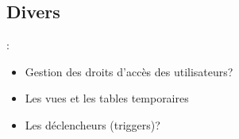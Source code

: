 \documentclass[10pt]{beamer}
\begin{document}
\subsection{Divers}
\begin{frame}{\secname : \subsecname}
    \begin{itemize}
        \item Gestion des droits d’accès des utilisateurs?
        \item Les vues et les tables temporaires
        \item Les déclencheurs (triggers)?
    \end{itemize}
\end{frame}
\end{document}

